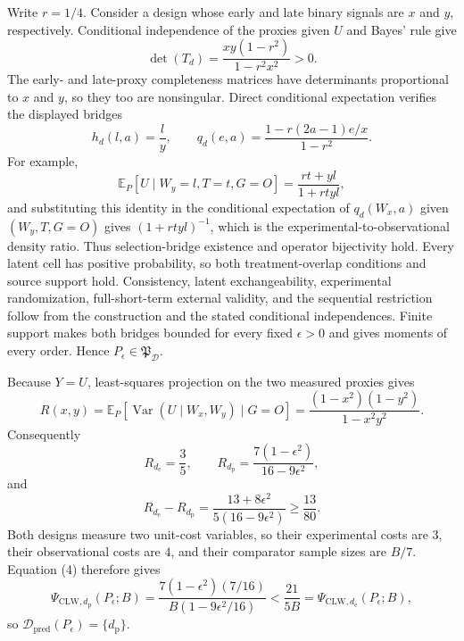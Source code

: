 Write \(r=1/4\).  Consider a design whose early and late binary signals are \(x\) and \(y\), respectively.  Conditional independence of the proxies given \(U\) and Bayes' rule give
\[
 \det(T_d)=\frac{xy(1-r^2)}{1-r^2x^2}>0. \tag{1}
\]
The early- and late-proxy completeness matrices have determinants proportional to \(x\) and \(y\), so they too are nonsingular.  Direct conditional expectation verifies the displayed bridges
\[
 h_d(l,a)=\frac l y,
 \qquad
 q_d(e,a)=\frac{1-r(2a-1)e/x}{1-r^2}. \tag{2}
\]
For example,
\[
 \mathbb E_P[U\mid W_y=l,T=t,G=O]
 =\frac{rt+yl}{1+rtyl},
\]
and substituting this identity in the conditional expectation of \(q_d(W_x,a)\) given \((W_y,T,G=O)\) gives \((1+rtyl)^{-1}\), which is the experimental-to-observational density ratio.  Thus selection-bridge existence and operator bijectivity hold.  Every latent cell has positive probability, so both treatment-overlap conditions and source support hold.  Consistency, latent exchangeability, experimental randomization, full-short-term external validity, and the sequential restriction follow from the construction and the stated conditional independences.  Finite support makes both bridges bounded for every fixed \(\epsilon>0\) and gives moments of every order.  Hence \(P_{\epsilon}\in\mathfrak P_{\mathcal D}\).

Because \(Y=U\), least-squares projection on the two measured proxies gives
\[
 R(x,y)=\mathbb E_P[\operatorname{Var}(U\mid W_x,W_y)\mid G=O]
 =\frac{(1-x^2)(1-y^2)}{1-x^2y^2}. \tag{3}
\]
Consequently
\[
 R_{d_{\mathrm e}}=\frac35,
 \qquad
 R_{d_{\mathrm p}}=\frac{7(1-\epsilon^2)}{16-9\epsilon^2},
\]
and
\[
 R_{d_{\mathrm e}}-R_{d_{\mathrm p}}
 =\frac{13+8\epsilon^2}{5(16-9\epsilon^2)}
 \ge\frac{13}{80}. \tag{4}
\]
Both designs measure two unit-cost variables, so their experimental costs are \(3\), their observational costs are \(4\), and their comparator sample sizes are \(B/7\).  Equation (4) therefore gives
\[
 \Psi_{\mathrm{CLW},d_{\mathrm p}}(P_{\epsilon};B)
 =\frac{7(1-\epsilon^2)(7/16)}{B(1-9\epsilon^2/16)}
 <\frac{21}{5B}
 =\Psi_{\mathrm{CLW},d_{\mathrm e}}(P_{\epsilon};B),
\]
so \(\mathcal D_{\mathrm{pred}}(P_{\epsilon})=\{d_{\mathrm p}\}\).

